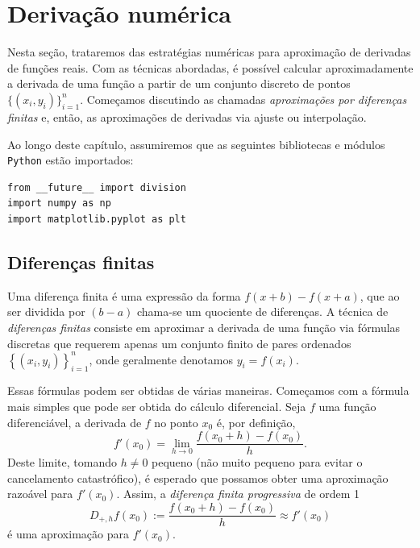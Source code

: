 
\chapter{Derivação numérica}

Nesta seção, trataremos das estratégias numéricas para aproximação de derivadas de funções reais. Com as técnicas abordadas, é possível calcular aproximadamente a derivada de uma função a partir de um conjunto discreto de pontos $\{(x_i, y_i)\}_{i=1}^n$. Começamos discutindo as chamadas \emph{aproximações por diferenças finitas} e, então, as aproximações de derivadas via ajuste ou interpolação.

\ifispython
Ao longo deste capítulo, assumiremos que as seguintes bibliotecas e módulos \verb+Python+ estão importados:
\begin{verbatim}
from __future__ import division
import numpy as np
import matplotlib.pyplot as plt
\end{verbatim}
\fi

\section{Diferenças finitas}

Uma diferença finita é uma expressão da forma $f(x+b)-f(x+a)$, que ao ser dividida por $(b-a)$ chama-se um quociente de diferenças. A técnica de \emph{diferenças finitas} consiste em aproximar a derivada de uma função via fórmulas discretas que requerem apenas um conjunto finito de pares ordenados $\left\{\left(x_i, y_i\right)\right\}_{i=1}^n$, onde geralmente denotamos $y_i=f(x_i)$.

Essas fórmulas podem ser obtidas de várias maneiras. Começamos com a fórmula mais simples que pode ser obtida do cálculo diferencial. Seja $f$ uma função diferenciável, a derivada de $f$ no ponto $x_0$ é, por definição,
\begin{equation}
  f'(x_0)=\lim_{h\to 0}\frac{f(x_0+h)-f(x_0)}{h}.
\end{equation}
Deste limite, tomando $h\neq 0$ pequeno (não muito pequeno para evitar o cancelamento catastrófico), é esperado que possamos obter uma aproximação razoável para $f'(x_0)$. Assim, a \emph{diferença finita progressiva} de ordem 1
\begin{equation}\label{eq:dp}
  D_{+,h}f(x_0) := \frac{f(x_0+h)-f(x_0)}{h} \approx f'(x_0)
\end{equation}
é uma aproximação para $f'(x_0)$.

